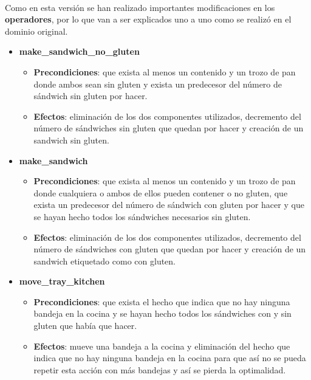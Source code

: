 \documentclass{article}
\begin{document}
\paragraph{}
Como en esta versión se han realizado importantes modificaciones en los \textbf{operadores}, por lo que van a ser explicados uno a uno como se realizó en el dominio original.

\begin{itemize}
    \item \textbf{make\_sandwich\_no\_gluten}
        \begin{itemize}
            \item \textbf{Precondiciones}: que exista al menos un contenido y un trozo de pan donde ambos sean sin gluten y exista un predecesor del número de sándwich sin gluten por hacer.
            \item \textbf{Efectos}: eliminación de los dos componentes utilizados, decremento del número de sándwiches sin gluten que quedan por hacer y creación de un sandwich sin gluten.
        \end{itemize}
    \item \textbf{make\_sandwich}
        \begin{itemize}
            \item \textbf{Precondiciones}: que exista al menos un contenido y un trozo de pan donde cualquiera o ambos de ellos pueden contener o no gluten, que exista un predecesor del número de sándwich con gluten por hacer y que se hayan hecho todos los sándwiches necesarios sin gluten.
            \item \textbf{Efectos}: eliminación de los dos componentes utilizados, decremento del número de sándwiches con gluten que quedan por hacer y creación de un sandwich etiquetado como con gluten.
        \end{itemize}
    \item \textbf{move\_tray\_kitchen}
        \begin{itemize}
            \item \textbf{Precondiciones}: que exista el hecho que indica que no hay ninguna bandeja en la cocina y se hayan hecho todos los sándwiches con y sin gluten que había que hacer.
            \item \textbf{Efectos}: mueve una bandeja a la cocina y eliminación del hecho que indica que no hay ninguna bandeja en la cocina para que así no se pueda repetir esta acción con más bandejas y así se pierda la optimalidad.
        \end{itemize}

\end{itemize}
\end{document}
